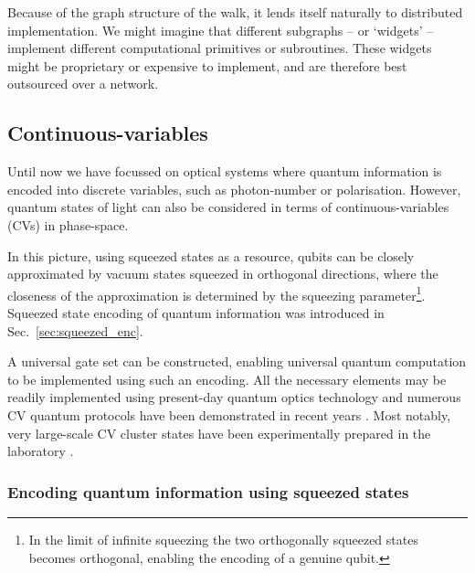 Because of the graph structure of the walk, it lends itself naturally to distributed implementation. We might imagine that different subgraphs -- or `widgets' \cite{bib:Lovett10, bib:Childs09} -- implement different computational primitives or subroutines. These widgets might be proprietary or expensive to implement, and are therefore best outsourced over a network.

%
%

\subsection{Continuous-variables} \label{sec:CV_QC} 


Until now we have focussed on optical systems where quantum information is encoded into discrete variables, such as photon-number or polarisation. However, quantum states of light can also be considered in terms of continuous-variables (CVs) in phase-space.

In this picture, using squeezed states as a resource, qubits can be closely approximated by vacuum states squeezed in orthogonal directions, where the closeness of the approximation is determined by the squeezing parameter\footnote{In the limit of infinite squeezing the two orthogonally squeezed states becomes orthogonal, enabling the encoding of a genuine qubit.}. Squeezed state encoding of quantum information was introduced in Sec.~\ref{sec:squeezed_enc}.

A universal gate set can be constructed, enabling universal quantum computation to be implemented using such an encoding. All the necessary elements may be readily implemented using present-day quantum optics technology and numerous CV quantum protocols have been demonstrated in recent years \cite{bib:RevModPhys.77.513}. Most notably, very large-scale CV cluster states have been experimentally prepared in the laboratory \cite{bib:yoshikawa2016invited}.

%
%

\subsubsection{Encoding quantum information using squeezed states}

